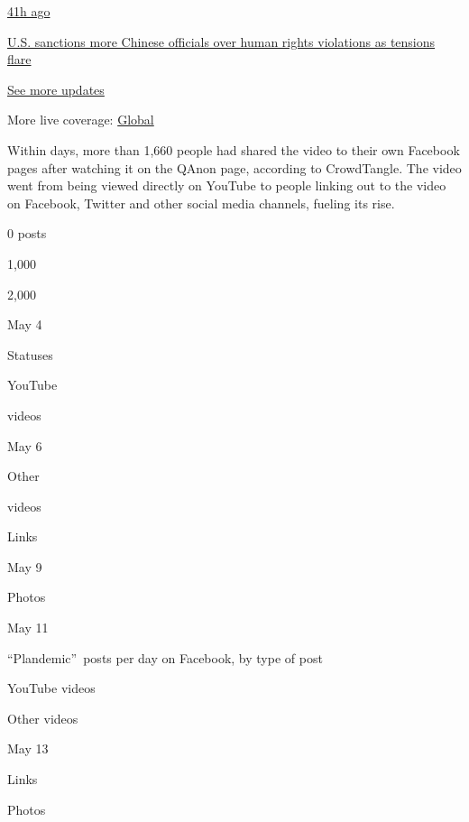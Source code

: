 \href{https://www.nytimes3xbfgragh.onion/live/2020/07/31/business/stock-market-today-coronavirus?action=click\&pgtype=Article\&state=default\&region=MAIN_CONTENT_1\&context=storylines_live_updates\#us-sanctions-more-chinese-officials-over-human-rights-violations-as-tensions-flare}{41h
ago}

\href{https://www.nytimes3xbfgragh.onion/live/2020/07/31/business/stock-market-today-coronavirus?action=click\&pgtype=Article\&state=default\&region=MAIN_CONTENT_1\&context=storylines_live_updates\#us-sanctions-more-chinese-officials-over-human-rights-violations-as-tensions-flare}{U.S.
sanctions more Chinese officials over human rights violations as
tensions flare}

\href{https://www.nytimes3xbfgragh.onion/live/2020/07/31/business/stock-market-today-coronavirus?action=click\&pgtype=Article\&state=default\&region=MAIN_CONTENT_1\&context=storylines_live_updates}{See
more updates}

More live coverage:
\href{https://www.nytimes3xbfgragh.onion/2020/08/01/world/coronavirus-covid-19.html?action=click\&pgtype=Article\&state=default\&region=MAIN_CONTENT_1\&context=storylines_live_updates}{Global}

Within days, more than 1,660 people had shared the video to their own
Facebook pages after watching it on the QAnon page, according to
CrowdTangle. The video went from being viewed directly on YouTube to
people linking out to the video on Facebook, Twitter and other social
media channels, fueling its rise.

0 posts

1,000

2,000

May 4

Statuses

YouTube

videos

May 6

Other

videos

Links

May 9

Photos

May 11

``Plandemic''~posts per day on Facebook, by type of post

YouTube videos

Other videos

May 13

Links

Photos


